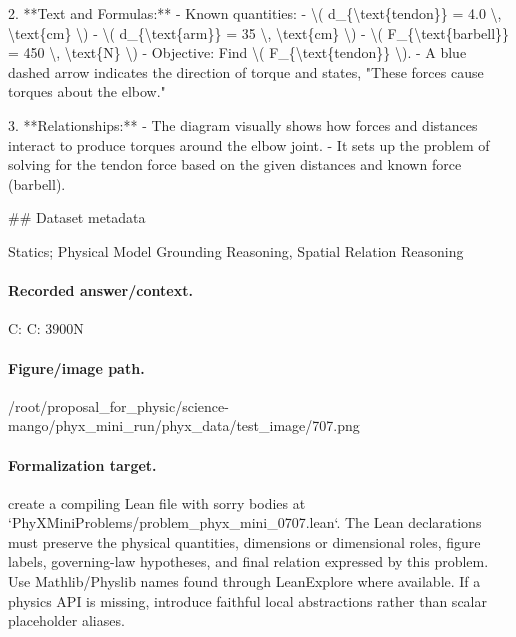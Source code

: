 2. **Text and Formulas:**
   - Known quantities:
     - \textbackslash{}( d\_\{\textbackslash{}text\{tendon\}\} = 4.0 \textbackslash{}, \textbackslash{}text\{cm\} \textbackslash{})
     - \textbackslash{}( d\_\{\textbackslash{}text\{arm\}\} = 35 \textbackslash{}, \textbackslash{}text\{cm\} \textbackslash{})
     - \textbackslash{}( F\_\{\textbackslash{}text\{barbell\}\} = 450 \textbackslash{}, \textbackslash{}text\{N\} \textbackslash{})
   - Objective: Find \textbackslash{}( F\_\{\textbackslash{}text\{tendon\}\} \textbackslash{}).
   - A blue dashed arrow indicates the direction of torque and states, "These forces cause torques about the elbow."

3. **Relationships:**
   - The diagram visually shows how forces and distances interact to produce torques around the elbow joint.
   - It sets up the problem of solving for the tendon force based on the given distances and known force (barbell).

\#\# Dataset metadata

Statics; Physical Model Grounding Reasoning, Spatial Relation Reasoning

\paragraph{Recorded answer/context.}
C: C: 3900N

\paragraph{Figure/image path.}
/root/proposal\_for\_physic/science-mango/phyx\_mini\_run/phyx\_data/test\_image/707.png

\paragraph{Formalization target.}
create a compiling Lean file with sorry bodies at `PhyXMiniProblems/problem\_phyx\_mini\_0707.lean`. The Lean declarations must preserve the physical quantities, dimensions or dimensional roles, figure labels, governing-law hypotheses, and final relation expressed by this problem.
Use Mathlib/Physlib names found through LeanExplore where available. If a physics API is missing, introduce faithful local abstractions rather than scalar placeholder aliases.

